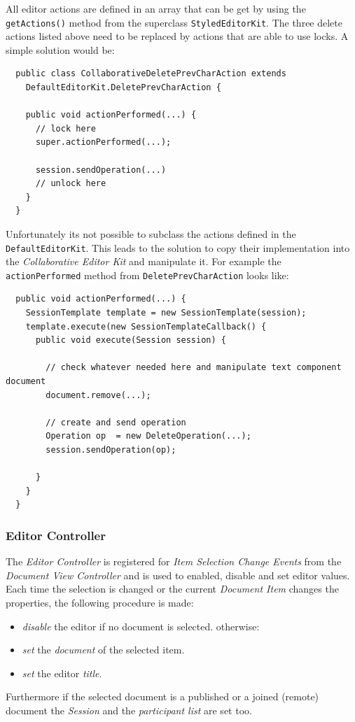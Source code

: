 All editor actions are defined in an array that can be get by using the \texttt{getActions()} method from the superclass \texttt{StyledEditorKit}. The three delete actions listed above need to be replaced by actions that are able to use locks. A simple solution would be:
\begin{verbatim}
  public class CollaborativeDeletePrevCharAction extends
    DefaultEditorKit.DeletePrevCharAction {
    
    public void actionPerformed(...) {
      // lock here
      super.actionPerformed(...);
      
      session.sendOperation(...)
      // unlock here
    }
  }
\end{verbatim}
Unfortunately its not possible to subclass the actions defined in the \texttt{DefaultEditorKit}. This leads to the solution to copy their implementation into the \textit{Collaborative Editor Kit} and manipulate it. For example the \texttt{actionPerformed} method from \texttt{DeletePrevCharAction} looks like:
\begin{verbatim}
  public void actionPerformed(...) {
    SessionTemplate template = new SessionTemplate(session);
    template.execute(new SessionTemplateCallback() {
      public void execute(Session session) {

        // check whatever needed here and manipulate text component document
        document.remove(...);
        
        // create and send operation
        Operation op  = new DeleteOperation(...);
        session.sendOperation(op);

      }
    }
  }
\end{verbatim}


\subsubsection{Editor Controller}
The \textit{Editor Controller} is registered for \textit{Item Selection Change Events} from the \textit{Document View Controller} and is used to enabled, disable and set editor values. Each time the selection is changed or the current \textit{Document Item} changes the properties, the following procedure is made:
\begin{itemize}
\item \textit{disable} the editor if no document is selected. otherwise:
\item \textit{set} the \textit{document} of the selected item.
\item \textit{set} the editor \textit{title}.
\end{itemize}
Furthermore if the selected document is a published or a joined (remote) document the \textit{Session} and the \textit{participant list} are set too.

